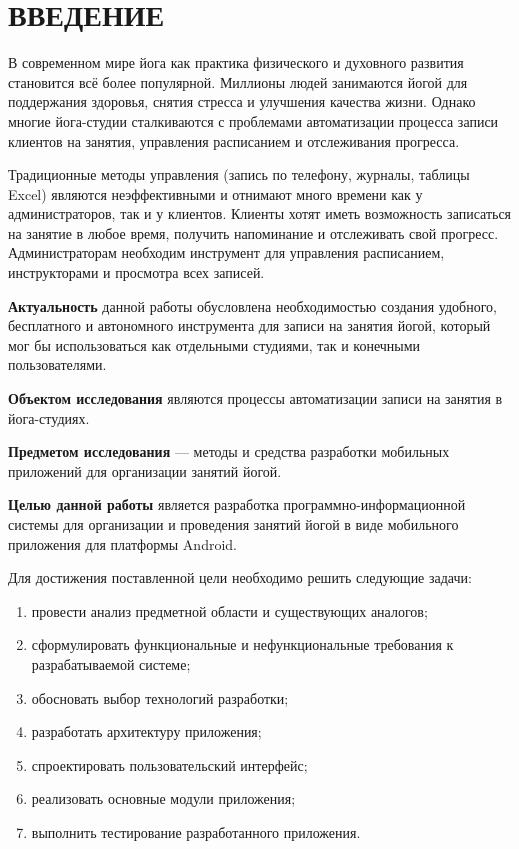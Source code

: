 \section*{ВВЕДЕНИЕ}

В современном мире йога как практика физического и духовного развития становится всё более популярной. Миллионы людей занимаются йогой для поддержания здоровья, снятия стресса и улучшения качества жизни. Однако многие йога-студии сталкиваются с проблемами автоматизации процесса записи клиентов на занятия, управления расписанием и отслеживания прогресса.

Традиционные методы управления (запись по телефону, журналы, таблицы Excel) являются неэффективными и отнимают много времени как у администраторов, так и у клиентов. Клиенты хотят иметь возможность записаться на занятие в любое время, получить напоминание и отслеживать свой прогресс. Администраторам необходим инструмент для управления расписанием, инструкторами и просмотра всех записей.

\textbf{Актуальность} данной работы обусловлена необходимостью создания удобного, бесплатного и автономного инструмента для записи на занятия йогой, который мог бы использоваться как отдельными студиями, так и конечными пользователями.

\textbf{Объектом исследования} являются процессы автоматизации записи на занятия в йога-студиях.

\textbf{Предметом исследования} — методы и средства разработки мобильных приложений для организации занятий йогой.

\textbf{Целью данной работы} является разработка программно-информационной системы для организации и проведения занятий йогой в виде мобильного приложения для платформы Android.

Для достижения поставленной цели необходимо решить следующие задачи:
\begin{enumerate}
	\item провести анализ предметной области и существующих аналогов;
	\item сформулировать функциональные и нефункциональные требования к разрабатываемой системе;
	\item обосновать выбор технологий разработки;
	\item разработать архитектуру приложения;
	\item спроектировать пользовательский интерфейс;
	\item реализовать основные модули приложения;
	\item выполнить тестирование разработанного приложения.
\end{enumerate}

